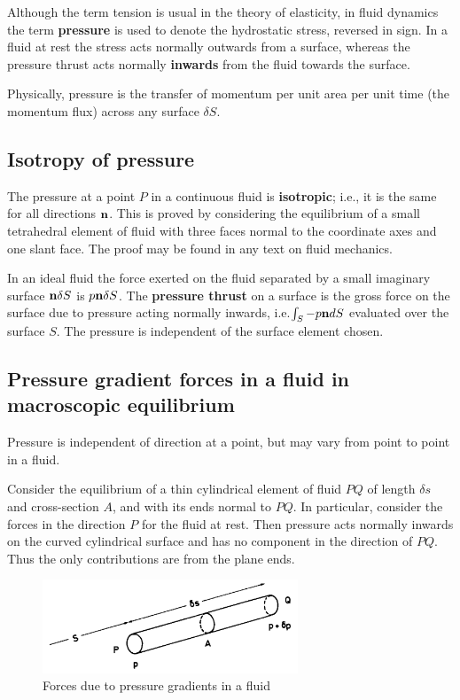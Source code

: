 \documentclass[10pt]{report}
\begin{document}
Although the term tension is usual in the theory of elasticity, in fluid
dynamics the term \textbf{pressure} is used to denote the hydrostatic
stress, reversed in sign. In a fluid at rest the stress acts normally
outwards from a surface, whereas the pressure thrust acts normally
\textbf{inwards} from the fluid towards the surface.

Physically, pressure is the transfer of momentum per unit area per unit time
(the momentum flux) across any surface $\delta S$.

\subsection{Isotropy of pressure}
The pressure at a point $P$ in a continuous fluid is \textbf{isotropic}; i.e.,
it is the same for all directions ${\bf n}$. This is proved by considering
the equilibrium of a small tetrahedral element of fluid with three faces
normal to the coordinate axes and one slant face. The proof may be found in
any text on fluid mechanics.

In an ideal fluid the force exerted on the fluid separated by a small
imaginary surface ${\bf n}\delta S$ is $p{\bf n}\delta S$. The
\textbf{pressure thrust} on a surface is the gross force on the surface due
to pressure acting normally inwards, i.e.$\int_S {-p{{\bf n}}dS}
$ evaluated over the surface $S$. The pressure is independent  of the
surface element chosen.

\subsection{Pressure gradient forces in a fluid in macroscopic equilibrium}
Pressure is independent of direction at a point, but may vary from point to
point in a fluid.

Consider the equilibrium of a thin cylindrical element of fluid $PQ$ of length
$\delta s$ and cross-section $A$, and with its ends normal to $PQ$. In particular,
consider the
forces in the direction $P$ for the fluid at rest. Then pressure acts normally
inwards on the curved cylindrical surface and has no component in the
direction of $PQ$. Thus the only contributions are from the plane ends.

\begin{figure}[htbp]
\centerline{\includegraphics[width=3in]{Section25.pdf}}
\label{fig2.5}
\caption{ Forces due to pressure gradients in a fluid }
\end{figure}
\end{document}
